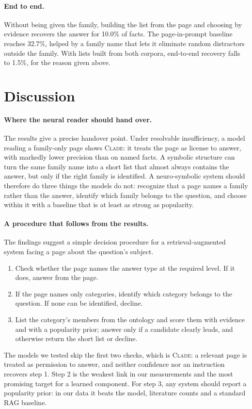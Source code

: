 \documentclass[letterpaper]{article} %
\newcommand{\clade}{\textsc{Clade}}
\begin{document}
\paragraph{End to end.}
Without being given the family, building the list from the page and choosing
by evidence recovers the answer for 10.0\% of facts. The page-in-prompt
baseline reaches 32.7\%, helped by a family name that lets it eliminate
random distractors outside the family. With lists built from both corpora,
end-to-end recovery falls to 1.5\%, for the reason given above.

\section{Discussion}

\paragraph{Where the neural reader should hand over.}
The results give a precise handover point. Under resolvable insufficiency, a
model reading a family-only page shows \clade{}: it treats the page as license
to answer, with markedly lower precision than on named
facts. A symbolic structure can turn the same family name into a short
list that almost always contains the answer, but only if the right family is
identified. A neuro-symbolic system should therefore do three things the
models do not: recognize that a page names a family rather than the answer,
identify which family belongs to the question, and choose within it with a
baseline that is at least as strong as popularity.

\paragraph{A procedure that follows from the results.}
The findings suggest a simple decision procedure for a retrieval-augmented
system facing a page about the question's subject.
\begin{enumerate}
\item Check whether the page names the answer type at the required level.
If it does, answer from the page.
\item If the page names only categories, identify which category belongs to
the question. If none can be identified, decline.
\item List the category's members from the ontology and score them with
evidence and with a popularity prior; answer only if a candidate clearly
leads, and otherwise return the short list or decline.
\end{enumerate}
The models we tested skip the first two checks, which is \clade{}: a relevant
page is treated as permission to answer, and neither confidence nor an instruction recovers
step 1. Step 2 is the weakest link in our measurements and the
most promising target for a learned component. For step 3, any system should
report a popularity prior: in our data it beats the model, literature counts
and a standard RAG baseline.
\end{document}

